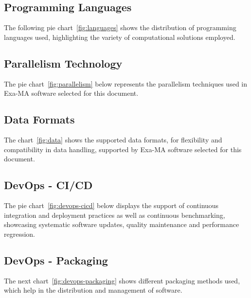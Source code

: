 
\subsection{Programming Languages}

The following pie chart~\ref{fig:languages} shows the distribution of programming languages used, highlighting the variety of computational solutions employed.


\subsection{Parallelism Technology}


The pie chart~\ref{fig:parallelism} below represents the parallelism techniques used in Exa-MA software selected for this document.



\subsection{Data Formats}

The chart~\ref{fig:data} shows the supported data formats, for flexibility and compatibility in data handling, supported by Exa-MA software selected for this document.


\subsection{DevOps - CI/CD}

The pie chart~\ref{fig:devops-cicd} below displays the support of continuous integration and deployment practices as well as continuous benchmarking, showcasing systematic software updates, quality maintenance and performance regression.


\subsection{DevOps - Packaging}

The next chart~\ref{fig:devops-packaging} shows different packaging methods used, which help in the distribution and management of software.


